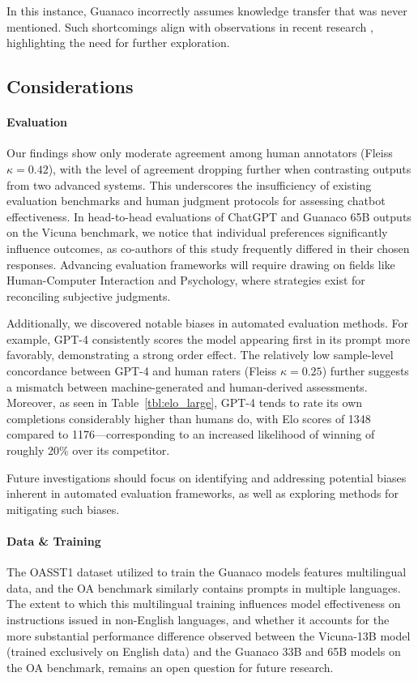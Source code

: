 In this instance, {Guanaco} incorrectly assumes knowledge transfer that was never mentioned. Such shortcomings align with observations in recent research \cite{sap2022neural}, highlighting the need for further exploration.

\subsection{Considerations}
\label{ssec:considerations}

\paragraph{Evaluation}

Our findings show only moderate agreement among human annotators (Fleiss $\kappa=0.42$), with the level of agreement dropping further when contrasting outputs from two advanced systems. This underscores the insufficiency of existing evaluation benchmarks and human judgment protocols for assessing chatbot effectiveness. In head-to-head evaluations of ChatGPT and {Guanaco} 65B outputs on the Vicuna benchmark, we notice that individual preferences significantly influence outcomes, as co-authors of this study frequently differed in their chosen responses. Advancing evaluation frameworks will require drawing on fields like Human-Computer Interaction and Psychology, where strategies exist for reconciling subjective judgments.

Additionally, we discovered notable biases in automated evaluation methods. For example, GPT-4 consistently scores the model appearing first in its prompt more favorably, demonstrating a strong order effect. The relatively low sample-level concordance between GPT-4 and human raters (Fleiss $\kappa=0.25$) further suggests a mismatch between machine-generated and human-derived assessments. Moreover, as seen in Table~\ref{tbl:elo_large}, GPT-4 tends to rate its own completions considerably higher than humans do, with Elo scores of 1348 compared to 1176—corresponding to an increased likelihood of winning of roughly 20\% over its competitor.

Future investigations should focus on identifying and addressing potential biases inherent in automated evaluation frameworks, as well as exploring methods for mitigating such biases.

\paragraph{Data \& Training} The OASST1 dataset utilized to train the {Guanaco} models features multilingual data, and the OA benchmark similarly contains prompts in multiple languages. The extent to which this multilingual training influences model effectiveness on instructions issued in non-English languages, and whether it accounts for the more substantial performance difference observed between the Vicuna-13B model (trained exclusively on English data) and the {Guanaco} 33B and 65B models on the OA benchmark, remains an open question for future research.

